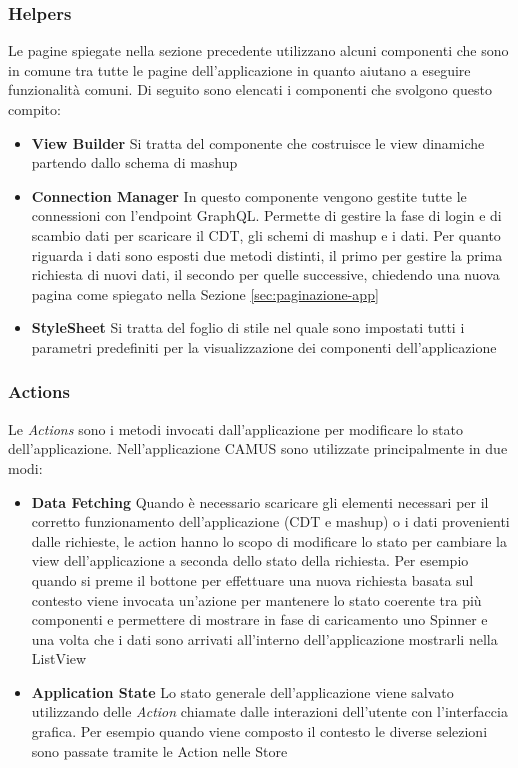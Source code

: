 \subsubsection{Helpers}

Le pagine spiegate nella sezione precedente utilizzano alcuni componenti che sono in comune tra tutte le pagine dell'applicazione in quanto aiutano a eseguire funzionalità comuni. Di seguito sono elencati i componenti che svolgono questo compito:

\begin{itemize}
	\item \textbf{View Builder}
	Si tratta del componente che costruisce le view dinamiche partendo dallo schema di mashup
	\item \textbf{Connection Manager}
	In questo componente vengono gestite tutte le connessioni con l'endpoint GraphQL. Permette di gestire la fase di login e di scambio dati per scaricare il CDT, gli schemi di mashup e i dati. Per quanto riguarda i dati sono esposti due metodi distinti, il primo per gestire la prima richiesta di nuovi dati, il secondo per quelle successive, chiedendo una nuova pagina come spiegato nella Sezione \ref{sec:paginazione-app}
	\item \textbf{StyleSheet}
	Si tratta del foglio di stile nel quale sono impostati tutti i parametri predefiniti per la visualizzazione dei componenti dell'applicazione
\end{itemize}

\subsubsection{Actions\label{sec:actions}}

Le \emph{Actions} sono i metodi invocati dall'ap\-pli\-ca\-zio\-ne per modificare lo stato dell'ap\-pli\-ca\-zio\-ne. Nell'applicazione CAMUS sono utilizzate principalmente in due modi:

\begin{itemize}
	\item \textbf{Data Fetching}
	Quando è necessario scaricare gli elementi necessari per il corretto funzionamento dell'applicazione (CDT e mashup) o i dati provenienti dalle richieste, le action hanno lo scopo di modificare lo stato per cambiare la view dell'applicazione a seconda dello stato della richiesta.
	Per esempio quando si preme il bottone per effettuare una nuova richiesta basata sul contesto viene invocata un'azione per mantenere lo stato coerente tra più componenti e permettere di mostrare in fase di caricamento uno Spinner e una volta che i dati sono arrivati all'interno dell'applicazione mostrarli nella ListView
	\item \textbf{Application State}
	Lo stato generale dell'applicazione viene salvato utilizzando delle \emph{Action} chiamate dalle interazioni dell'utente con l'interfaccia grafica. Per esempio quando viene composto il contesto le diverse selezioni sono passate tramite le Action nelle Store
\end{itemize}	

